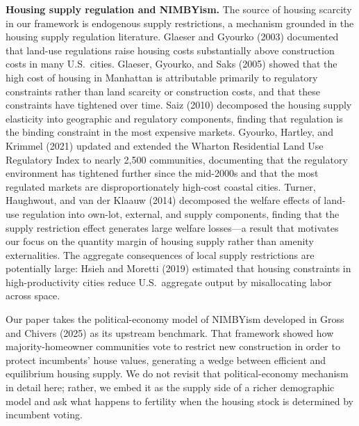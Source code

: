 \medskip
\noindent\textbf{Housing supply regulation and NIMBYism.}
The source of housing scarcity in our framework is endogenous supply restrictions, a mechanism grounded in the housing supply regulation literature. Glaeser and Gyourko (2003) documented that land-use regulations raise housing costs substantially above construction costs in many U.S.\ cities. Glaeser, Gyourko, and Saks (2005) showed that the high cost of housing in Manhattan is attributable primarily to regulatory constraints rather than land scarcity or construction costs, and that these constraints have tightened over time. Saiz (2010) decomposed the housing supply elasticity into geographic and regulatory components, finding that regulation is the binding constraint in the most expensive markets. Gyourko, Hartley, and Krimmel (2021) updated and extended the Wharton Residential Land Use Regulatory Index to nearly 2,500 communities, documenting that the regulatory environment has tightened further since the mid-2000s and that the most regulated markets are disproportionately high-cost coastal cities. Turner, Haughwout, and van der Klaauw (2014) decomposed the welfare effects of land-use regulation into own-lot, external, and supply components, finding that the supply restriction effect generates large welfare losses---a result that motivates our focus on the quantity margin of housing supply rather than amenity externalities. The aggregate consequences of local supply restrictions are potentially large: Hsieh and Moretti (2019) estimated that housing constraints in high-productivity cities reduce U.S.\ aggregate output by misallocating labor across space.

Our paper takes the political-economy model of NIMBYism developed in Gross and Chivers (2025) as its upstream benchmark. That framework showed how majority-homeowner communities vote to restrict new construction in order to protect incumbents' house values, generating a wedge between efficient and equilibrium housing supply. We do not revisit that political-economy mechanism in detail here; rather, we embed it as the supply side of a richer demographic model and ask what happens to fertility when the housing stock is determined by incumbent voting.


